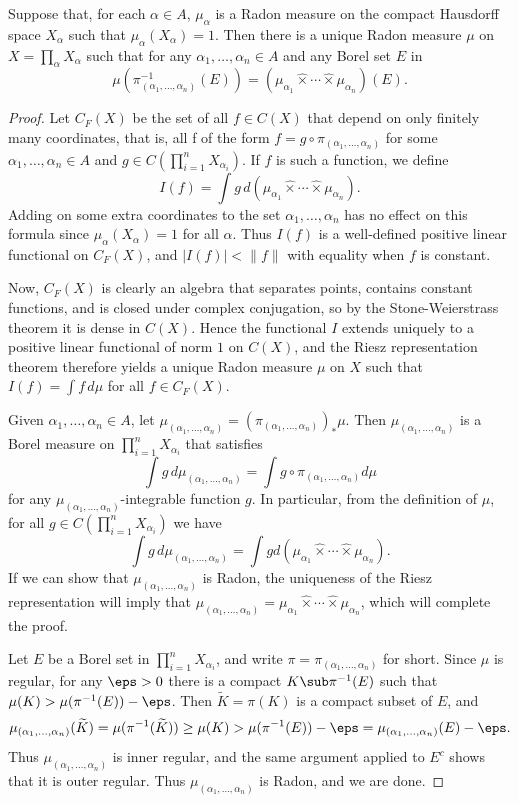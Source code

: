 \begin{proposition}\label{Radon product infinite}
Suppose that, for each $\alpha\in A$, $\mu_\alpha$ is a Radon measure on the compact Hausdorff space $X_\alpha$ such that $\mu_\alpha(X_\alpha)=1$. Then there is a unique Radon measure $\mu$ on $X=\prod_{\alpha}X_\alpha$ such that for any $\alpha_1,\dots,\alpha_n\in A$ and any Borel set $E$ in
\[\mu(\pi^{-1}_{(\alpha_1,\dots,\alpha_n)}(E))=(\mu_{\alpha_1}\hat{\times}\cdots\hat{\times}\mu_{\alpha_n})(E).\]
\end{proposition}
\begin{proof}
Let $C_F(X)$ be the set of all $f\in C(X)$ that depend on only finitely many coordinates, that is, all f of the form $f=g\circ\pi_{(\alpha_1,\dots,\alpha_n)}$ for some $\alpha_1,\dots,\alpha_n\in A$ and $g\in C(\prod_{i=1}^{n}X_{\alpha_i})$. If $f$ is such a function, we define
\[I(f)=\int g\,d(\mu_{\alpha_1}\hat{\times}\cdots\hat{\times}\mu_{\alpha_n}).\]
Adding on some extra coordinates to the set $\alpha_1,\dots,\alpha_n$ has no effect on this formula since $\mu_\alpha(X_\alpha)=1$ for all $\alpha$. Thus $I(f)$ is a well-defined positive linear functional on $C_F(X)$, and $|I(f)|<\|f\|$ with equality when $f$ is constant.\par
Now, $C_F(X)$ is clearly an algebra that separates points, contains constant functions, and is closed under complex conjugation, so by the Stone-Weierstrass theorem it is dense in $C(X)$. Hence the functional $I$ extends uniquely to a positive linear functional of norm $1$ on $C(X)$, and the Riesz representation theorem therefore yields a unique Radon measure $\mu$ on $X$ such that $I(f)=\int f\,d\mu$ for all $f\in C_F(X)$.\par
Given $\alpha_1,\dots,\alpha_n\in A$, let $\mu_{(\alpha_1,\dots,\alpha_n)}=(\pi_{(\alpha_1,\dots,\alpha_n)})_*\mu$. Then $\mu_{(\alpha_1,\dots,\alpha_n)}$ is a Borel measure on $\prod_{i=1}^{n}X_{\alpha_i}$ that satisfies
\[\int g\,d\mu_{(\alpha_1,\dots,\alpha_n)}=\int g\circ\pi_{(\alpha_1,\dots,\alpha_n)}d\mu\]
for any $\mu_{(\alpha_1,\dots,\alpha_n)}$-integrable function $g$. In particular, from the definition of $\mu$, for all $g\in C(\prod_{i=1}^{n}X_{\alpha_i})$ we have
\[\int g\,d\mu_{(\alpha_1,\dots,\alpha_n)}=\int g d(\mu_{\alpha_1}\hat{\times}\cdots\hat{\times}\mu_{\alpha_n}).\]
If we can show that $\mu_{(\alpha_1,\dots,\alpha_n)}$ is Radon, the uniqueness of the Riesz representation will imply that $\mu_{(\alpha_1,\dots,\alpha_n)}=\mu_{\alpha_1}\hat{\times}\cdots\hat{\times}\mu_{\alpha_n}$, which will complete the proof.\par
Let $E$ be a Borel set in $\prod_{i=1}^{n}X_{\alpha_i}$, and write $\pi=\pi_{(\alpha_1,\dots,\alpha_n)}$ for short. Since $\mu$ is regular, for any $\eps>0$ there is a compact $K\sub\pi^{-1}(E)$ such that $\mu(K)>\mu(\pi^{-1}(E))-\eps$. Then $\widetilde{K}=\pi(K)$ is a compact subset of $E$, and 
\[\mu_{(\alpha_1,\dots,\alpha_n)}(\widetilde{K})=\mu(\pi^{-1}(\widetilde{K}))\geq\mu(K)>\mu(\pi^{-1}(E))-\eps=\mu_{(\alpha_1,\dots,\alpha_n)}(E)-\eps.\]
Thus $\mu_{(\alpha_1,\dots,\alpha_n)}$ is inner regular, and the same argument applied to $E^c$ shows that it is outer regular. Thus $\mu_{(\alpha_1,\dots,\alpha_n)}$ is Radon, and we are done.
\end{proof}
\newpage
